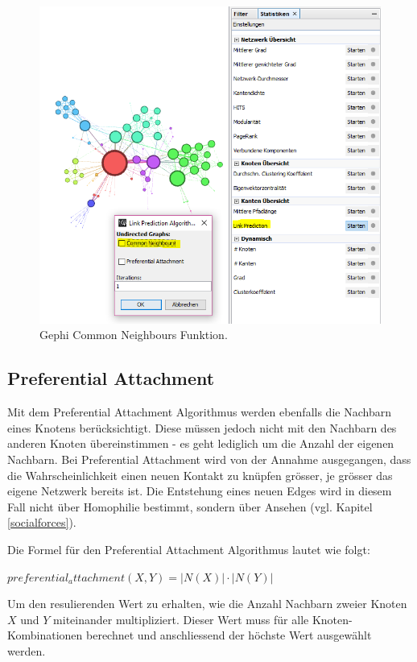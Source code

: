 \begin{figure}[htbp]
    \includegraphics[width=\linewidth]{resources/gephi-CN.png}
    \caption{Gephi Common Neighbours Funktion.}
    \label{fig:screen8}
\end{figure}

\subsection{Preferential Attachment}
Mit dem Preferential Attachment Algorithmus werden ebenfalls die Nachbarn eines Knotens berücksichtigt. Diese müssen jedoch nicht
mit den Nachbarn des anderen Knoten übereinstimmen - es geht lediglich um die Anzahl der eigenen Nachbarn. Bei Preferential Attachment
wird von der Annahme ausgegangen, dass die Wahrscheinlichkeit einen neuen Kontakt zu knüpfen grösser, je grösser das eigene Netzwerk bereits ist.
Die Entstehung eines neuen Edges wird in diesem Fall nicht über Homophilie bestimmt, sondern über Ansehen (vgl. Kapitel \ref{socialforces}).

Die Formel für den Preferential Attachment Algorithmus lautet wie folgt:

$preferential_attachment(X,Y) = | N(X) | \cdot | N(Y ) |$

Um den resulierenden Wert zu erhalten, wie die Anzahl Nachbarn zweier Knoten $X$ und $Y$ miteinander multipliziert. Dieser Wert muss für alle Knoten-Kombinationen berechnet und anschliessend der höchste Wert
ausgewählt werden.

